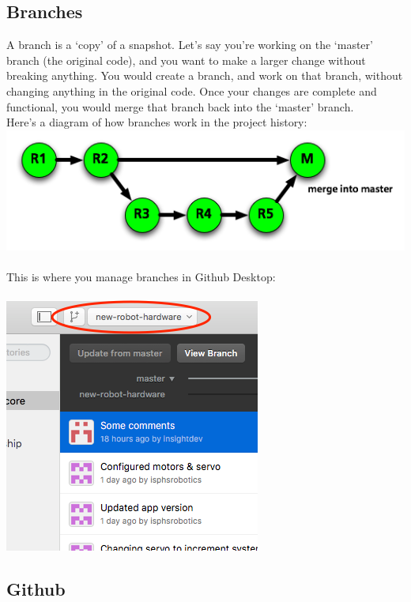 \documentclass[12p,a4paper]{article}
\begin{document}
\subsection{Branches}

A branch is a `copy' of a snapshot. Let's say you're working on the `master' branch (the original code), and you want to make a larger change without breaking anything. You would create a branch, and work on that branch, without changing anything in the original code. Once your changes are complete and functional, you would merge that branch back into the `master' branch.\\
Here's a diagram of how branches work in the project history:\\
\includegraphics[scale=0.6]{git-branches}\\ \\
This is where you manage branches in Github Desktop:\\\\
\includegraphics[scale=0.6]{github-desktop-branches}

\subsection{Github}
\end{document}
